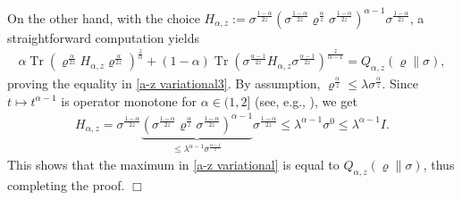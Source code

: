 \documentclass[unsortedaddress,superscriptaddress,pra,notitlepage]{revtex4}
\newenvironment{proof}[1][Proof]{\begin{trivlist}
\item[\hskip \labelsep {\bfseries #1}]}{\hfill$\Box$\end{trivlist}}
\def\rho{\varrho}
\def\bz{\left(}
\def\jz{\right)}
\DeclareMathOperator{\Tr}{Tr}
\begin{document}
\begin{proof}
On the other hand, with the choice 
$H_{\alpha,z}:=\sigma^{\frac{1-\alpha}{2z}}\bz\sigma^{\frac{1-\alpha}{2z}}\rho^{\frac{\alpha}{z}} 
\sigma^{\frac{1-\alpha}{2z}}\jz^{\alpha-1}\sigma^{\frac{1-\alpha}{2z}}$, a straightforward 
computation yields
\begin{align*}
\alpha\Tr \bz \rho^{\frac{\alpha}{2z}} H_{\alpha,z}\rho^{\frac{\alpha}{2z}} \jz^{\frac{z}{\alpha}}
+(1-\alpha)\Tr\bz \sigma^{\frac{\alpha-1}{2z}}H_{\alpha,z}\sigma^{\frac{\alpha-1}{2z}}\jz^{\frac{z}{\alpha-1}}=Q_{\alpha,z}(\rho\|\sigma),
\end{align*}
proving the equality in \eqref{a-z variational3}.
By assumption, $\rho^{\frac{\alpha}{z}}\le\lambda\sigma^{\frac{\alpha}{z}}$.
Since $t\mapsto t^{\alpha-1}$ is operator monotone for $\alpha\in(1,2]$
(see, e.g., \cite{Bhatia}), we get 
\begin{align*}
H_{\alpha,z}
=
\sigma^{\frac{1-\alpha}{2z}}
\underbrace{\bz\sigma^{\frac{1-\alpha}{2z}}\rho^{\frac{\alpha}{z}} 
\sigma^{\frac{1-\alpha}{2z}}\jz^{\alpha-1}}_{\le\lambda^{\alpha-1}\sigma^{\frac{\alpha-1}{z}}}
\sigma^{\frac{1-\alpha}{2z}}
\le
\lambda^{\alpha-1}\sigma^0
\le
\lambda^{\alpha-1}I.
\end{align*}
This shows that the maximum in \eqref{a-z variational} is equal to $Q_{\alpha,z}(\rho\|\sigma)$, thus completing the proof.
\end{proof}
\end{document}
